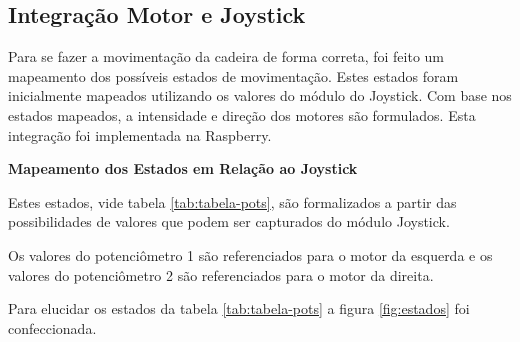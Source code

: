 \subsection{Integração Motor e Joystick}

Para se fazer a movimentação da cadeira de forma correta, foi feito um mapeamento dos possíveis estados de movimentação. Estes estados foram inicialmente mapeados utilizando os valores do módulo do Joystick. Com base nos estados mapeados, a intensidade e direção dos motores são formulados. Esta integração foi implementada na Raspberry.

  \textbf{Mapeamento dos Estados em Relação ao Joystick}

  Estes estados, vide tabela \ref{tab:tabela-pots}, são formalizados a partir das possibilidades de valores que podem ser capturados do módulo Joystick.

  Os valores do potenciômetro 1 são referenciados para o motor da esquerda e os valores do potenciômetro 2 são referenciados para o motor da direita.

  \begin{table}[!ht]
  \centering
  \caption{Mapeamento dos estados conforme valores do Joystick}
  \label{tab:tabela-pots}
  \end{table}

  Para elucidar os estados da tabela \ref{tab:tabela-pots} a figura \ref{fig:estados} foi confeccionada.

